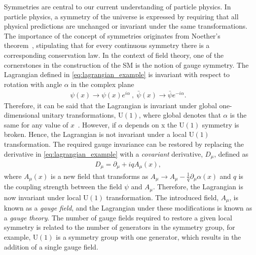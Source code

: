 Symmetries are central to our current understanding of particle physics. In particle physics, a symmetry of the universe is expressed by requiring that all physical predictions are unchanged or invariant under the same transformations. The importance of the concept of symmetries originates from Noether's theorem~\cite{Noether1918}, stipulating that for every continuous symmetry there is a corresponding conservation law. In the context of field theory, one of the cornerstones in the construction of the SM is the notion of gauge symmetry. The Lagrangian defined in \cref{eq:lagrangian_example} is invariant with respect to rotation with angle $\alpha$ in the complex plane 
\begin{equation}
    \label{eq:unitary}
    \begin{aligned}
        \psi(x) \rightarrow \psi(x)e^{i\alpha}~,~\bar{\psi}(x) \rightarrow \bar{\psi}e^{-i\alpha}.
    \end{aligned}
\end{equation}
Therefore, it can be said that the Lagrangian is invariant under global one-dimensional unitary transformations, $\mathrm{U(1)}$, where global denotes that $\alpha$ is the same for any value of $x$~\cite{stephanhaywood}. However, if $\alpha$ depends on x the $\mathrm{U(1)}$ symmetry is broken. Hence, the Lagrangian is not invariant under a local $\mathrm{U(1)}$ transformation. The required gauge invariance can be restored by replacing the derivative in \cref{eq:lagrangian_example} with a \emph{covariant} derivative, $D_\mu$, defined as 
\begin{equation}
    \label{eq:covdir}
    \begin{aligned}
        D_\mu = \partial_\mu + iqA_\mu(x),
    \end{aligned}
\end{equation}
where $A_\mu(x)$ is a new field that transforms as $A_\mu \rightarrow A_\mu - \frac{1}{q}\partial_\mu\alpha(x)$ and $q$ is the coupling strength between the field $\psi$ and $A_\mu$. Therefore, the Lagrangian is now invariant under local $\mathrm{U(1)}$ transformation. The introduced field, $A_\mu$, is known as a \emph{gauge field}, and the Lagrangian under these modifications is known as a \emph{gauge theory}. The number of gauge fields required to restore a given local symmetry is related to the number of generators in the symmetry group, for example, $\mathrm{U(1)}$ is a symmetry group with one generator, which results in the addition of a single gauge field. 

